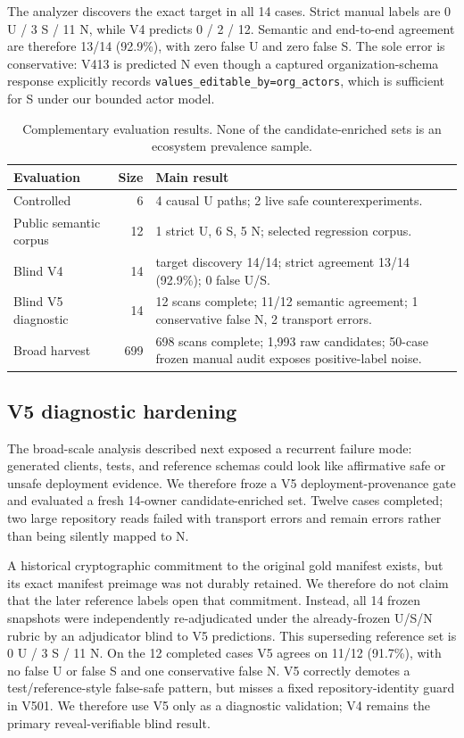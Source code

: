 \documentclass[sigconf,review,anonymous]{acmart}
\newcommand{\U}{\textsf{U}}
\newcommand{\Ssafe}{\textsf{S}}
\newcommand{\N}{\textsf{N}}
\begin{document}
The analyzer discovers the exact target in all 14 cases.  Strict manual labels
are 0 \U{} / 3 \Ssafe{} / 11 \N{}, while V4 predicts 0 / 2 / 12.  Semantic and
end-to-end agreement are therefore 13/14 (92.9\%), with zero false \U{} and zero
false \Ssafe{}.  The sole error is conservative: V413 is predicted \N{} even
though a captured organization-schema response explicitly records
\texttt{values\_editable\_by=org\_actors}, which is sufficient for \Ssafe{} under
our bounded actor model.

\begin{table}[t]
\caption{Complementary evaluation results.  None of the candidate-enriched sets
is an ecosystem prevalence sample.}
\label{tab:eval}
\small
\begin{tabularx}{\columnwidth}{@{}l r X@{}}
\toprule
Evaluation & Size & Main result \\
\midrule
Controlled & 6 & 4 causal \U{} paths; 2 live safe counterexperiments. \\
Public semantic corpus & 12 & 1 strict \U{}, 6 \Ssafe{}, 5 \N{}; selected regression corpus. \\
Blind V4 & 14 & target discovery 14/14; strict agreement 13/14 (92.9\%); 0 false \U{}/\Ssafe{}. \\
Blind V5 diagnostic & 14 & 12 scans complete; 11/12 semantic agreement; 1 conservative false \N{}, 2 transport errors. \\
Broad harvest & 699 & 698 scans complete; 1,993 raw candidates; 50-case frozen manual audit exposes positive-label noise. \\
\bottomrule
\end{tabularx}
\end{table}

\subsection{V5 diagnostic hardening}

The broad-scale analysis described next exposed a recurrent failure mode:
generated clients, tests, and reference schemas could look like affirmative safe
or unsafe deployment evidence.  We therefore froze a V5 deployment-provenance
gate and evaluated a fresh 14-owner candidate-enriched set.  Twelve cases
completed; two large repository reads failed with transport errors and remain
errors rather than being silently mapped to \N{}.

A historical cryptographic commitment to the original gold manifest exists, but
its exact manifest preimage was not durably retained.  We therefore do not claim
that the later reference labels open that commitment.  Instead, all 14 frozen
snapshots were independently re-adjudicated under the already-frozen U/S/N
rubric by an adjudicator blind to V5 predictions.  This superseding reference
set is 0 \U{} / 3 \Ssafe{} / 11 \N{}.  On the 12 completed cases V5 agrees on
11/12 (91.7\%), with no false \U{} or false \Ssafe{} and one conservative false
\N{}.  V5 correctly demotes a test/reference-style false-safe pattern, but misses
a fixed repository-identity guard in V501.  We therefore use V5 only as a
diagnostic validation; V4 remains the primary reveal-verifiable blind result.
\end{document}
